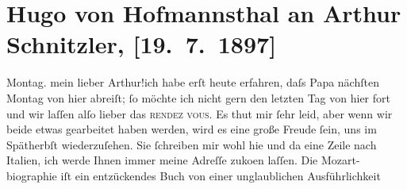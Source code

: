 

         
         \renewcommand{\erwaehntePersonen}{Personen: Richard Beer-Hofmann, Hugo August von Hofmannsthal, Wolfgang Amadeus Mozart}
         \renewcommand{\erwaehnteOrte}{Orte: Bad Fusch, Italien, Wien}
         \renewcommand{\erwaehnteWerke}{Werke: W. A. Mozart}
               \section[Hugo von Hofmannsthal an Arthur Schnitzler, {[}19. 7. 1897{]}]{ Hugo von Hofmannsthal an Arthur Schnitzler, {[}19. 7. 1897{]}}\nopagebreak{}\rehead{ }\begin{ledgroupsized}[t]{13cm}\normalsize\beginnumbering \toendnotes[C]{\smallbreak\pagebreak[2]} 
\toendnotes[C]{\smallbreak}\pstart
           \raggedleft{}{\pb}Montag.\pend
           \pstart
           mein lieber Arthur!ich habe erſt heute erfahren, daſs Papa nächſten
                        Montag von hier abreiſt; ſo möchte ich nicht gern den letzten Tag von hier fort
                    und wir laſſen alſo lieber das \textsc{rendez vous}. Es thut
                    mir ſehr leid, aber wenn wir beide etwas gearbeitet haben werden, wird es eine
                    große Freude ſein, uns im Spätherbſt wieder{\pb}zuſehen. Sie ſchreiben mir
                    wohl hie und da eine Zeile nach Italien, ich
                    werde Ihnen immer meine Adreſſe zuko{\geminationm}en laſſen.\pend
           \pstart
           Die Mozart-biographie iſt ein entzückendes Buch von einer unglaublichen Ausführlichkeit

\end{ledgroupsized}
